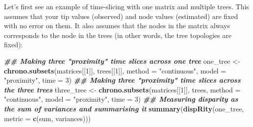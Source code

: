 \documentclass[
]{book}
\newenvironment{Shaded}{\begin{snugshade}}{\end{snugshade}}
\newcommand{\AttributeTok}[1]{\textcolor[rgb]{0.13,0.29,0.53}{#1}}
\newcommand{\ConstantTok}[1]{\textcolor[rgb]{0.56,0.35,0.01}{#1}}
\newcommand{\ControlFlowTok}[1]{\textcolor[rgb]{0.13,0.29,0.53}{\textbf{#1}}}
\newcommand{\DecValTok}[1]{\textcolor[rgb]{0.00,0.00,0.81}{#1}}
\newcommand{\DocumentationTok}[1]{\textcolor[rgb]{0.56,0.35,0.01}{\textbf{\textit{#1}}}}
\newcommand{\FunctionTok}[1]{\textcolor[rgb]{0.13,0.29,0.53}{\textbf{#1}}}
\newcommand{\NormalTok}[1]{#1}
\newcommand{\OtherTok}[1]{\textcolor[rgb]{0.56,0.35,0.01}{#1}}
\newcommand{\SpecialCharTok}[1]{\textcolor[rgb]{0.81,0.36,0.00}{\textbf{#1}}}
\newcommand{\StringTok}[1]{\textcolor[rgb]{0.31,0.60,0.02}{#1}}
\begin{document}
\begin{Shaded}
\end{Shaded}

Let's first see an example of time-slicing with one matrix and multiple trees.
This assumes that your tip values (observed) and node values (estimated) are fixed with no error on them.
It also assumes that the nodes in the matrix always corresponds to the node in the trees (in other words, the tree topologies are fixed):

\begin{Shaded}
\begin{Highlighting}[]
\DocumentationTok{\#\# Making three "proximity" time slices across one tree}
\NormalTok{one\_tree }\OtherTok{\textless{}{-}} \FunctionTok{chrono.subsets}\NormalTok{(matrices[[}\DecValTok{1}\NormalTok{]], trees[[}\DecValTok{1}\NormalTok{]],}
                           \AttributeTok{method =} \StringTok{"continuous"}\NormalTok{,}
                           \AttributeTok{model =} \StringTok{"proximity"}\NormalTok{, }\AttributeTok{time =} \DecValTok{3}\NormalTok{)}
\DocumentationTok{\#\# Making three "proximity" time slices across the three trees}
\NormalTok{three\_tree }\OtherTok{\textless{}{-}} \FunctionTok{chrono.subsets}\NormalTok{(matrices[[}\DecValTok{1}\NormalTok{]], trees,}
                             \AttributeTok{method =} \StringTok{"continuous"}\NormalTok{,}
                             \AttributeTok{model =} \StringTok{"proximity"}\NormalTok{, }\AttributeTok{time =} \DecValTok{3}\NormalTok{)}
\DocumentationTok{\#\# Measuring disparity as the sum of variances and summarising it}
\FunctionTok{summary}\NormalTok{(}\FunctionTok{dispRity}\NormalTok{(one\_tree, }\AttributeTok{metric =} \FunctionTok{c}\NormalTok{(sum, variances)))}
\end{Highlighting}
\end{Shaded}
\end{document}
